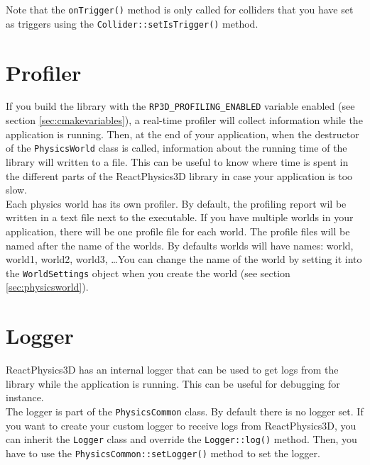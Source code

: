 \documentclass[a4paper,12pt]{article}
\begin{document}
    Note that the \texttt{onTrigger()} method is only called for colliders that you have set as triggers using the \texttt{Collider::setIsTrigger()} method.

    \section{Profiler}
    \label{sec:profiler}

    If you build the library with the \texttt{RP3D\_PROFILING\_ENABLED} variable enabled (see section \ref{sec:cmakevariables}), a real-time profiler
    will collect information while the application is running. Then, at the end of your application, when the destructor of the \texttt{PhysicsWorld}
    class is called, information about the running time of the library will written to a file.
    This can be useful to know where time is spent in the different parts of the ReactPhysics3D library in case your application is too slow. \\

    Each physics world has its own profiler. By default, the profiling report wil be written in a text file next to the executable.
    If you have multiple worlds in your application, there will be one profile file for each world. The profile files will be named after the
    name of the worlds. By defaults worlds will have names: world, world1, world2, world3, \dots You can change the name of the world by
    setting it into the \texttt{WorldSettings} object when you create the world (see section \ref{sec:physicsworld}). \\

    \section{Logger}
    \label{sec:logger}

    ReactPhysics3D has an internal logger that can be used to get logs from the library while the application is running. This can be useful for
    debugging for instance. \\

    The logger is part of the \texttt{PhysicsCommon} class. By default there is no logger set. If you want to create your custom logger to receive logs
    from ReactPhysics3D, you can inherit the \texttt{Logger} class and override the \texttt{Logger::log()} method. Then, you have to use the
    \texttt{PhysicsCommon::setLogger()} method to set the logger. \\
\end{document}
